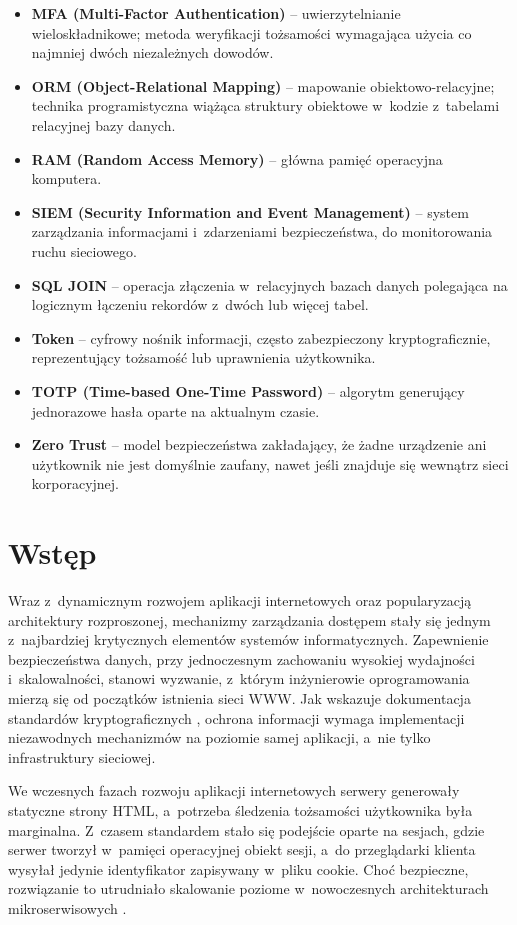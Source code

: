 \documentclass{SGGW-thesis}
\begin{document}
\begin{itemize}
    \item \textbf{MFA (Multi-Factor Authentication)} – uwierzytelnianie wieloskładnikowe; metoda weryfikacji tożsamości wymagająca użycia co najmniej dwóch niezależnych dowodów.
    \item \textbf{ORM (Object-Relational Mapping)} – mapowanie obiektowo-relacyjne; technika programistyczna wiążąca struktury obiektowe w~kodzie z~tabelami relacyjnej bazy danych.
    \item \textbf{RAM (Random Access Memory)} – główna pamięć operacyjna komputera.
    \item \textbf{SIEM (Security Information and Event Management)} – system zarządzania informacjami i~zdarzeniami bezpieczeństwa, do monitorowania ruchu sieciowego.
    \item \textbf{SQL JOIN} – operacja złączenia w~relacyjnych bazach danych polegająca na logicznym łączeniu rekordów z~dwóch lub więcej tabel.
    \item \textbf{Token} – cyfrowy nośnik informacji, często zabezpieczony kryptograficznie, reprezentujący tożsamość lub uprawnienia użytkownika.
    \item \textbf{TOTP (Time-based One-Time Password)} – algorytm generujący jednorazowe hasła oparte na aktualnym czasie.
    \item \textbf{Zero Trust} – model bezpieczeństwa zakładający, że żadne urządzenie ani użytkownik nie jest domyślnie zaufany, nawet jeśli znajduje się wewnątrz sieci korporacyjnej.
\end{itemize}

\clearpage
\tableofcontents

\startchapterfromoddpage
\chapter{Wstęp}

Wraz z~dynamicznym rozwojem aplikacji internetowych oraz popularyzacją architektury rozproszonej, mechanizmy zarządzania dostępem stały się jednym z~najbardziej krytycznych elementów systemów informatycznych. Zapewnienie bezpieczeństwa danych, przy jednoczesnym zachowaniu wysokiej wydajności i~skalowalności, stanowi wyzwanie, z~którym inżynierowie oprogramowania mierzą się od początków istnienia sieci WWW. Jak wskazuje dokumentacja standardów kryptograficznych \cite{stallings2017}, ochrona informacji wymaga implementacji niezawodnych mechanizmów na poziomie samej aplikacji, a~nie tylko infrastruktury sieciowej. 

We wczesnych fazach rozwoju aplikacji internetowych serwery generowały statyczne strony HTML, a~potrzeba śledzenia tożsamości użytkownika była marginalna. Z~czasem standardem stało się podejście oparte na sesjach, gdzie serwer tworzył w~pamięci operacyjnej obiekt sesji, a~do przeglądarki klienta wysyłał jedynie identyfikator zapisywany w~pliku cookie. Choć bezpieczne, rozwiązanie to utrudniało skalowanie poziome w~nowoczesnych architekturach mikroserwisowych \cite{fowler2002}.
\end{document}
